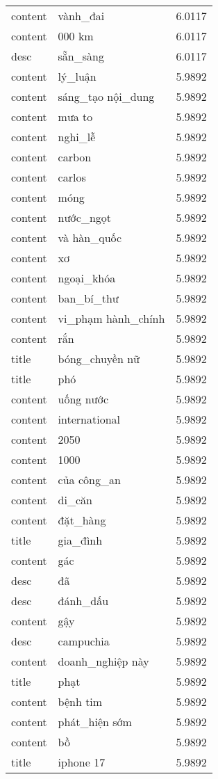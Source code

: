 \documentclass{article}
\begin{document}
\begin{tabular}{lll}
content & vành\_đai & 6.0117\\
content & 000 km & 6.0117\\
desc & sẵn\_sàng & 6.0117\\
content & lý\_luận & 5.9892\\
content & sáng\_tạo nội\_dung & 5.9892\\
content & mưa to & 5.9892\\
content & nghi\_lễ & 5.9892\\
content & carbon & 5.9892\\
content & carlos & 5.9892\\
content & móng & 5.9892\\
content & nước\_ngọt & 5.9892\\
content & và hàn\_quốc & 5.9892\\
content & xơ & 5.9892\\
content & ngoại\_khóa & 5.9892\\
content & ban\_bí\_thư & 5.9892\\
content & vi\_phạm hành\_chính & 5.9892\\
content & rắn & 5.9892\\
title & bóng\_chuyền nữ & 5.9892\\
title & phó & 5.9892\\
content & uống nước & 5.9892\\
content & international & 5.9892\\
content & 2050 & 5.9892\\
content & 1000 & 5.9892\\
content & của công\_an & 5.9892\\
content & di\_căn & 5.9892\\
content & đặt\_hàng & 5.9892\\
title & gia\_đình & 5.9892\\
content & gác & 5.9892\\
desc & đã & 5.9892\\
desc & đánh\_dấu & 5.9892\\
content & gậy & 5.9892\\
desc & campuchia & 5.9892\\
content & doanh\_nghiệp này & 5.9892\\
title & phạt & 5.9892\\
content & bệnh tim & 5.9892\\
content & phát\_hiện sớm & 5.9892\\
content & bồ & 5.9892\\
title & iphone 17 & 5.9892\\

\end{tabular}
\end{document}
